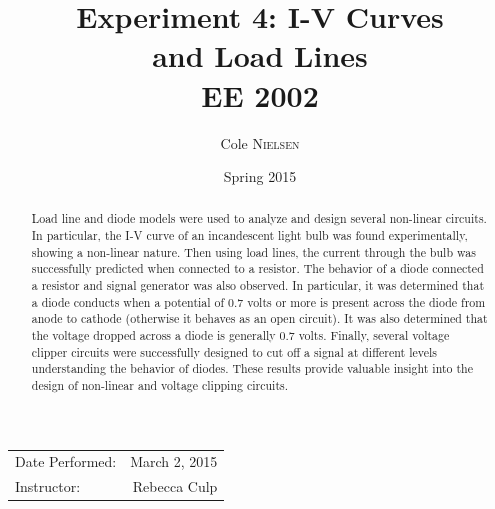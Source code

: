 \documentclass[12pt]{article}
\title{Experiment 4: I-V Curves  \\ and Load Lines \\ \vspace{0.3 in} EE 2002}
\author{Cole \textsc{Nielsen}}
\date{Spring 2015}
\begin{document}
\maketitle 

\begin{center}
 \begin{tabular}{l r}
   Date Performed: & March 2, 2015 \\ 
   Instructor: & Rebecca Culp \\ 
\end{tabular}
\end{center}
\pagebreak

\begin{abstract}
Load line and diode models were used to analyze and design several non-linear circuits. In particular, the I-V curve of an incandescent light bulb was found experimentally, showing a non-linear nature. Then using load lines, the current through the bulb was successfully predicted when connected to a resistor. The behavior of a diode connected a resistor and signal generator was also observed. In particular, it was determined that a diode conducts when a potential of 0.7 volts or more is present across the diode from anode to cathode (otherwise it behaves as an open circuit). It was also determined that the voltage dropped across a diode is generally 0.7 volts. Finally, several voltage clipper circuits were successfully designed to cut off a signal at different levels understanding the behavior of diodes. These results provide valuable insight into the design of non-linear and voltage clipping circuits.
\end{abstract}

\end{document}
